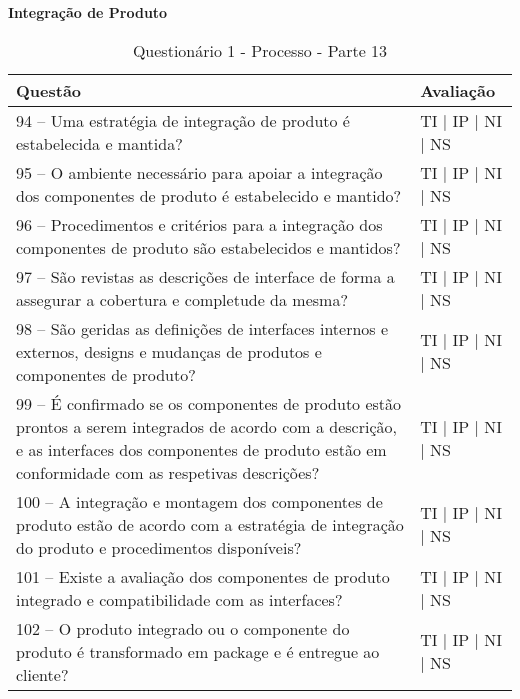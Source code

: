 \documentclass[openany,10pt,a4paper]{article}
\begin{document}
\begin{appendix}
\begin{table}[h]
\textbf{Integração de Produto}
	\centering
	\caption{Questionário 1 - Processo - Parte 13}
	\begin{tabular}{p{3.5in}p{2in}}		
		\toprule
		\textbf{Questão}  & \textbf{Avaliação}\\ 
		\midrule
		94 – Uma estratégia de integração de produto é estabelecida e mantida?
 & TI | IP | NI | NS \\
        \midrule
		95 – O ambiente necessário para apoiar a integração dos componentes de produto é 
estabelecido e mantido?
 & TI | IP | NI | NS \\
		\midrule
		96 – Procedimentos e critérios para a integração dos componentes de produto são estabelecidos 
e mantidos?
 & TI | IP | NI | NS \\
		\midrule
        97 – São revistas as descrições de interface de forma a assegurar a cobertura e completude da 
mesma?
 & TI | IP | NI | NS \\
		\midrule
		98 – São geridas as definições de interfaces internos e externos, designs e mudanças de produtos 
e componentes de produto?
  & TI | IP | NI | NS \\
		\midrule
		99 – É confirmado se os componentes de produto estão prontos a serem integrados de acordo 
com a descrição, e as interfaces dos componentes de produto estão em conformidade com as
respetivas descrições? 
 & TI | IP | NI | NS \\
 \midrule
		100 – A integração e montagem dos componentes de produto estão de acordo com a estratégia
de integração do produto e procedimentos disponíveis? 
 & TI | IP | NI | NS \\
 \midrule
		101 – Existe a avaliação dos componentes de produto integrado e compatibilidade com as
interfaces? 
 & TI | IP | NI | NS \\
 \midrule
		102 – O produto integrado ou o componente do produto é transformado em package e é
entregue ao cliente? 
 & TI | IP | NI | NS \\
		\bottomrule
	\end{tabular} 
	\label{tab:tabela1}
\end{table}


\end{appendix}
\end{document}
